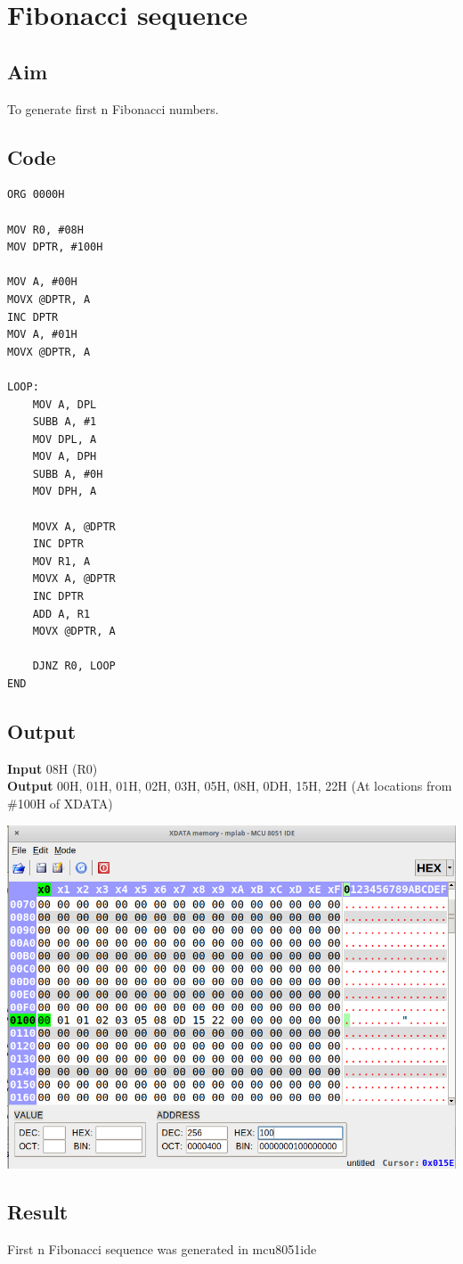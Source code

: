 \section{Fibonacci sequence}
\subsection{Aim}
To generate first n Fibonacci numbers.

\subsection{Code}
\begin{lstlisting}
ORG 0000H

MOV R0, #08H
MOV DPTR, #100H

MOV A, #00H
MOVX @DPTR, A
INC DPTR
MOV A, #01H
MOVX @DPTR, A

LOOP:
	MOV A, DPL
	SUBB A, #1
	MOV DPL, A
	MOV A, DPH
	SUBB A, #0H
	MOV DPH, A

	MOVX A, @DPTR
	INC DPTR
	MOV R1, A
	MOVX A, @DPTR
	INC DPTR
	ADD A, R1
	MOVX @DPTR, A

	DJNZ R0, LOOP
END
\end{lstlisting}

\subsection{Output}
\textbf{Input} 08H (R0)\\
\textbf{Output} 00H, 01H, 01H, 02H, 03H, 05H, 08H, 0DH, 15H, 22H (At locations from \#100H of XDATA)\\
\begin{center}
	\includegraphics[width=\textwidth]{img/p28.png}
\end{center}


\subsection{Result}
First n Fibonacci sequence was generated in mcu8051ide